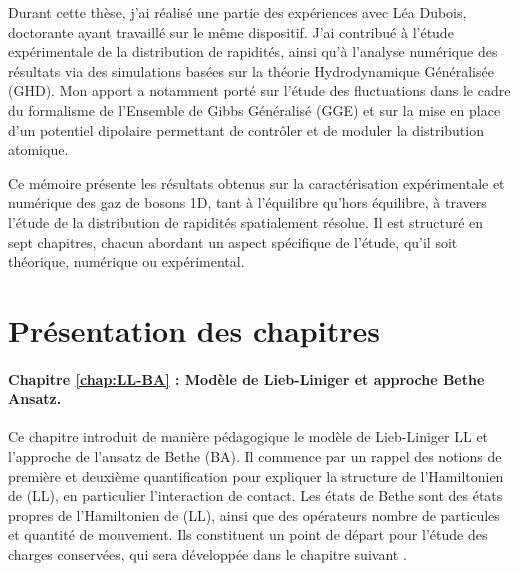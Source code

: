 \medskip

Durant cette thèse, j’ai réalisé une partie des expériences avec Léa Dubois, doctorante ayant travaillé sur le même dispositif. J’ai contribué à l’étude expérimentale de la distribution de rapidités, ainsi qu’à l’analyse numérique des résultats via des simulations basées sur la théorie Hydrodynamique Généralisée (\acrshort{GHD}). Mon apport a notamment porté sur l’étude des fluctuations dans le cadre du formalisme de l'Ensemble de Gibbs Généralisé (\acrshort{GGE}) et sur la mise en place d’un potentiel dipolaire permettant de contrôler et de moduler la distribution atomique.  

\medskip

Ce mémoire présente les résultats obtenus sur la caractérisation expérimentale et numérique des gaz de bosons 1D, tant à l’équilibre qu’hors équilibre, à travers l’étude de la distribution de rapidités spatialement résolue. Il est structuré en sept chapitres, chacun abordant un aspect spécifique de l’étude, qu’il soit théorique, numérique ou expérimental.



\section*{Présentation des chapitres}


\paragraph*{Chapitre \ref{chap:LL-BA} : Modèle de Lieb-Liniger et approche Bethe Ansatz.}  
Ce chapitre introduit de manière pédagogique le modèle de Lieb-Liniger \gls{LL} et l’approche de l’ansatz de Bethe (\acrshort{BA}). Il commence par un rappel des notions de première et deuxième quantification pour expliquer la structure de l’Hamiltonien de (\acrshort{LL}), en particulier l’interaction de contact. Les états de Bethe sont des états propres de l’Hamiltonien de (\acrshort{LL}), ainsi que des opérateurs nombre de particules et quantité de mouvement. Ils constituent un point de départ pour l’étude des charges conservées, qui sera développée dans le chapitre suivant \cite{Caux_2011}.

